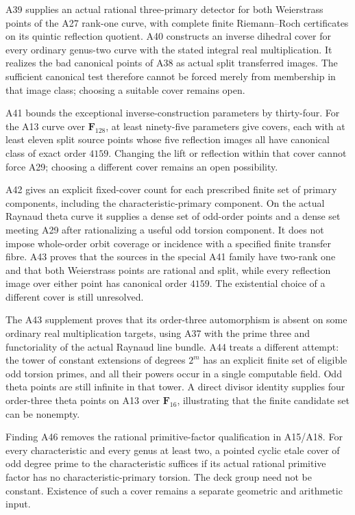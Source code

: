 \documentclass[11pt,a4paper]{article}
\begin{document}
A39 supplies an actual rational three-primary detector for both
Weierstrass points of the A27 rank-one curve, with complete finite
Riemann--Roch certificates on its quintic reflection quotient.
A40 constructs an inverse dihedral cover for every ordinary genus-two
curve with the stated integral real multiplication. It realizes the
bad canonical points of A38 as actual split transferred images.
The sufficient canonical test therefore cannot be forced merely from
membership in that image class; choosing a suitable cover remains open.

A41 bounds the exceptional inverse-construction parameters by thirty-four.
For the A13 curve over $\mathbf F_{128}$, at least ninety-five parameters
give covers, each with at least eleven split source points whose five
reflection images all have canonical class of exact order $4159$.
Changing the lift or reflection within that cover cannot force A29;
choosing a different cover remains an open possibility.

A42 gives an explicit fixed-cover count for each prescribed finite set
of primary components, including the characteristic-primary component.
On the actual Raynaud theta curve it supplies a dense set of odd-order
points and a dense set meeting A29 after rationalizing a useful odd
torsion component. It does not impose whole-order orbit coverage or
incidence with a specified finite transfer fibre. A43 proves that the
sources in the special A41 family have two-rank one and that both
Weierstrass points are rational and split, while every reflection image
over either point has canonical order $4159$. The existential choice
of a different cover is still unresolved.

The A43 supplement proves that its order-three automorphism is absent
on some ordinary real multiplication targets, using A37 with the prime
three and functoriality of the actual Raynaud line bundle. A44 treats a
different attempt: the tower of constant extensions of degrees $2^m$
has an explicit finite set of eligible odd torsion primes, and all their
powers occur in a single computable field. Odd theta points are still
infinite in that tower. A direct divisor identity supplies four
order-three theta points on A13 over $\mathbf F_{16}$, illustrating
that the finite candidate set can be nonempty.

Finding A46 removes the rational primitive-factor qualification in A15/A18.
For every characteristic and every genus at least two, a pointed cyclic
etale cover of odd degree prime to the characteristic suffices if its
actual rational primitive factor has no characteristic-primary torsion.
The deck group need not be constant. Existence of such a cover remains
a separate geometric and arithmetic input.
\end{document}
